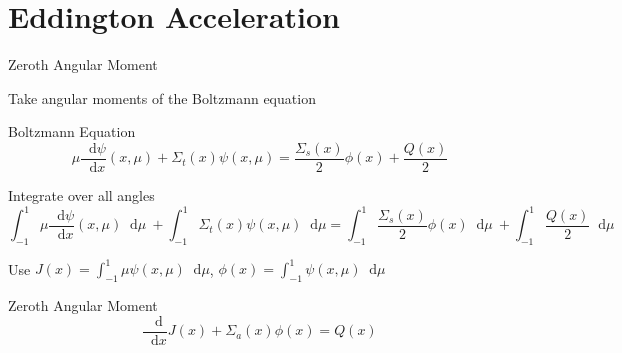 \documentclass[10pt]{beamer}
\newcommand{\ud}{\mathop{}\!\mathrm{d}} %
\newcommand{\dderiv}[2]{\frac{\ud #1}{\ud #2}}
\begin{document}




\section{Eddington Acceleration}

\begin{frame}{Zeroth Angular Moment}

	Take angular moments of the Boltzmann equation 

    \pause
	Boltzmann Equation
	\begin{equation*}
	        \mu \dderiv{\psi}{x}(x, \mu) + 
	        \Sigma_t(x) \psi(x,\mu) = 
	        \frac{\Sigma_s(x)}{2} \phi(x) + 
	        \frac{Q(x)}{2} 
	\end{equation*}

	\pause
	Integrate over all angles \footnotesize
	\begin{equation*}
	    \int_{-1}^{1} \mu \dderiv{\psi}{x}(x, \mu) \ud \mu \ + 
	    \int_{-1}^{1} \Sigma_t(x) \psi(x,\mu) \ud \mu = 
	    \int_{-1}^{1} \frac{\Sigma_s(x)}{2} \phi(x) \ud \mu \ + 
	    \int_{-1}^{1} \frac{Q(x)}{2} \ud \mu 
	\end{equation*}
    \normalsize

    \pause
	Use $J(x) = \int_{-1}^{1} \mu \psi(x,\mu) \ud \mu$, 
		$\phi(x) = \int_{-1}^{1} \psi(x,\mu) \ud \mu$ 
	\begin{block}{Zeroth Angular Moment}
	\begin{equation*}
		\dderiv{}{x} J(x) + \Sigma_a(x) \phi(x) = Q(x)
	\end{equation*}
	\end{block}

\end{frame}
\end{document}
